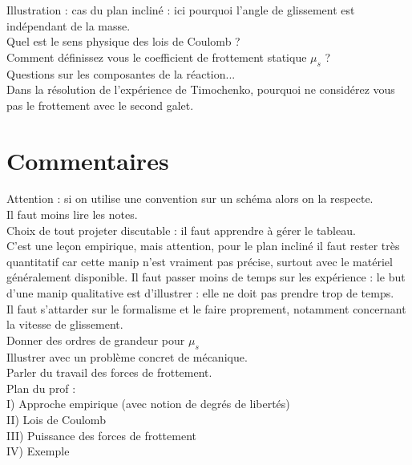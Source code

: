 \documentclass[12pt,prb,aps,epsf]{report}
\begin{document}
Illustration : cas du plan incliné : ici pourquoi l'angle de glissement est indépendant de la masse.\\

Quel est le sens physique des lois de Coulomb ?\\

Comment définissez vous le coefficient de frottement statique $\mu_s$ ?\\

Questions sur les composantes de la réaction...\\

Dans la résolution de l'expérience de Timochenko, pourquoi ne considérez vous pas le frottement avec le second galet.

\section{Commentaires}
Attention : si on utilise une convention sur un schéma alors on la respecte.\\
Il faut moins lire les notes.\\
Choix de tout projeter discutable : il faut apprendre à gérer le tableau.\\
C'est une leçon empirique, mais attention, pour le plan incliné il faut rester très quantitatif car cette manip n'est vraiment pas précise, surtout avec le matériel généralement disponible. Il faut passer moins de temps sur les expérience : le but d'une manip qualitative est d'illustrer : elle ne doit pas prendre trop de temps.\\
Il faut s'attarder sur le formalisme et le faire proprement, notamment concernant la vitesse de glissement.\\
Donner des ordres de grandeur pour $\mu_s$\\
Illustrer avec un problème concret de mécanique.\\
Parler du travail des forces de frottement.\\
Plan du prof :\\
I) Approche empirique (avec notion de degrés de libertés)\\
II) Lois de Coulomb\\
III) Puissance des forces de frottement\\
IV) Exemple
\end{document}
